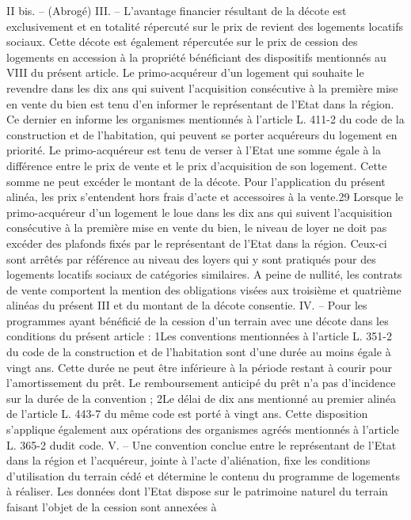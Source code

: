 \documentclass[11pt,a4paper]{report}
\begin{document}
	II bis. – (Abrogé)
	III. – L'avantage financier résultant de la décote est exclusivement et en totalité répercuté sur le prix de revient
	des logements locatifs sociaux.
	Cette décote est également répercutée sur le prix de cession des logements en accession à la propriété
	bénéficiant des dispositifs mentionnés au VIII du présent article.
	Le primo-acquéreur d'un logement qui souhaite le revendre dans les dix ans qui suivent l'acquisition consécutive
	à la première mise en vente du bien est tenu d'en informer le représentant de l'Etat dans la région. Ce dernier en
	informe les organismes mentionnés à l'article L. 411-2 du code de la construction et de l'habitation, qui peuvent
	se porter acquéreurs du logement en priorité. Le primo-acquéreur est tenu de verser à l'Etat une somme égale à
	la différence entre le prix de vente et le prix d'acquisition de son logement. Cette somme ne peut excéder le
	montant de la décote. Pour l'application du présent alinéa, les prix s'entendent hors frais d'acte et accessoires à
	la vente.29
	Lorsque le primo-acquéreur d'un logement le loue dans les dix ans qui suivent l'acquisition consécutive à la
	première mise en vente du bien, le niveau de loyer ne doit pas excéder des plafonds fixés par le représentant de
	l'Etat dans la région. Ceux-ci sont arrêtés par référence au niveau des loyers qui y sont pratiqués pour des
	logements locatifs sociaux de catégories similaires.
	A peine de nullité, les contrats de vente comportent la mention des obligations visées aux troisième et quatrième
	alinéas du présent III et du montant de la décote consentie.
	IV. – Pour les programmes ayant bénéficié de la cession d'un terrain avec une décote dans les conditions du
	présent article :
	1\degre  Les conventions mentionnées à l'article L. 351-2 du code de la construction et de l'habitation sont d'une durée
	au moins égale à vingt ans. Cette durée ne peut être inférieure à la période restant à courir pour l'amortissement
	du prêt. Le remboursement anticipé du prêt n'a pas d'incidence sur la durée de la convention ;
	2\degre  Le délai de dix ans mentionné au premier alinéa de l'article L. 443-7 du même code est porté à vingt ans.
	Cette disposition s'applique également aux opérations des organismes agréés mentionnés à l'article L. 365-2
	dudit code.
	V. – Une convention conclue entre le représentant de l'Etat dans la région et l'acquéreur, jointe à l'acte
	d'aliénation, fixe les conditions d'utilisation du terrain cédé et détermine le contenu du programme de logements
	à réaliser.
	Les données dont l'Etat dispose sur le patrimoine naturel du terrain faisant l'objet de la cession sont annexées à
\end{document}
